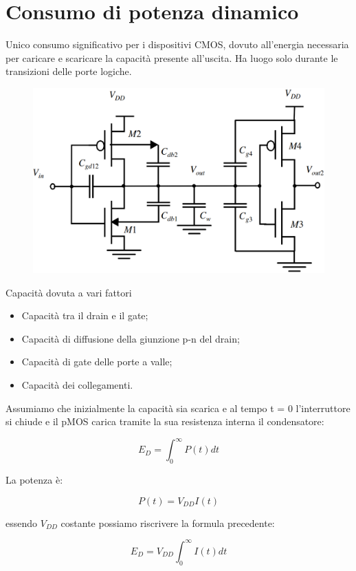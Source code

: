 \section{Consumo di potenza dinamico}

Unico consumo significativo per i dispositivi CMOS, dovuto all'energia necessaria per	caricare e	scaricare la	
capacità presente all'uscita. Ha	luogo solo	durante le	transizioni delle porte logiche.


\begin{figure}[htbp]
    \centering
    \includegraphics[width=0.5\linewidth]{img/cmosd.png}    
    
\end{figure}


\newpage
Capacità dovuta a	vari fattori

\begin{itemize}
    \item Capacità tra il drain	e	il gate;
    \item Capacità di	diffusione della giunzione p-n	del	drain;
    \item Capacità di	gate	delle porte a	valle;
    \item Capacità dei collegamenti.
\end{itemize}

Assumiamo	che inizialmente la	capacità sia scarica e al	tempo	t	=	0	l'interruttore si chiude e il	pMOS carica tramite la	sua resistenza interna il condensatore:

\begin{equation*}
    E_D = \int_0^\infty P(t)dt
\end{equation*}

La potenza è:

\begin{equation*}
    P(t) = V_{DD}I(t)
\end{equation*}

essendo $V_{DD}$ costante possiamo riscrivere la formula precedente:

\begin{equation*}
    E_D = V_{DD} \int_0^\infty I(t)dt
\end{equation*}


